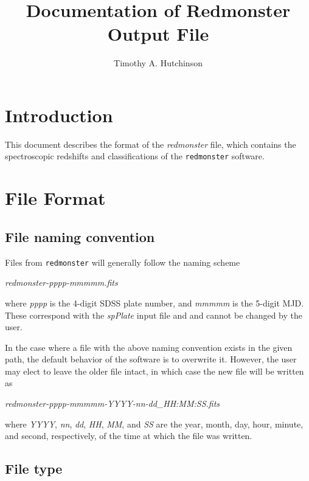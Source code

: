 \documentclass[12pt]{article}
\begin{document}
\title{Documentation of Redmonster Output File}

\author{Timothy A. Hutchinson}

\maketitle

\section{Introduction}

This document describes the format of the \textit{redmonster} file,
which contains the spectroscopic redshifts and classifications of
the \texttt{redmonster} software.

\section{File Format}

\subsection{File naming convention}

Files from \texttt{redmonster} will generally follow the naming scheme

\hspace*{36pt}\textit{redmonster-pppp-mmmmm.fits}

where \textit{pppp} is the 4-digit SDSS plate number, and \textit{mmmmm}
is the 5-digit MJD.  These correspond with the \textit{spPlate} input file and
and cannot be changed by the user.

In the case where a file with the above naming convention exists in the given path, 
the default behavior of the software is to overwrite it.  However, the user may 
elect to leave the older file intact, in which case the new file will be written as

\hspace*{36pt}\textit{redmonster-pppp-mmmmm-YYYY-nn-dd\_HH:MM:SS.fits}

where \textit{YYYY}, \textit{nn}, \textit{dd}, \textit{HH}, \textit{MM}, and \textit{SS}
are the year, month, day, hour, minute, and second, respectively, of the time at which
the file was written.

\subsection{File type}
\end{document}
